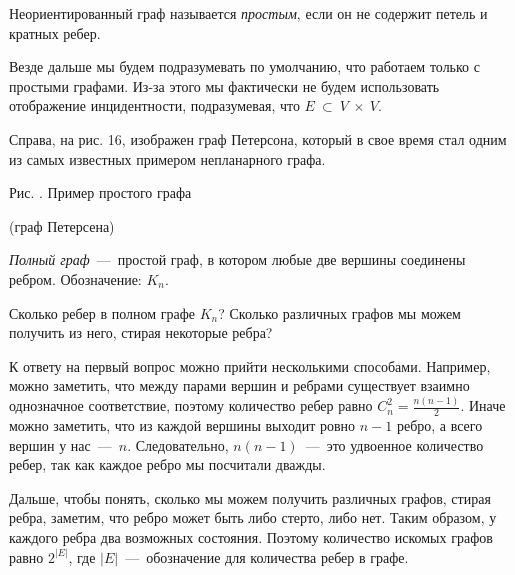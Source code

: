 \begin{paracol}{2}
\begin{definition}
	Неориентированный граф называется \emph{простым}, если он не содержит петель и кратных ребер.
\end{definition}

	Везде дальше мы будем подразумевать по умолчанию, что работаем только с простыми графами. Из-за этого мы фактически не будем использовать отображение инцидентности, подразумевая, что $E~\subset~V~\times~V$.
	
	Справа, на рис. 16, изображен граф Петерсона, который в свое время стал одним из самых известных примером непланарного графа.
\switchcolumn
\begin{center}\end{center}
\begin{center}
	\small Рис. \images. Пример простого графа 
	
	(граф Петерсена)
\end{center}
\end{paracol}

\begin{definition}
	\emph{Полный граф}~---~простой граф, в котором любые две вершины соединены ребром. Обозначение: $K_n$.
\end{definition}

\begin{example}
	Сколько ребер в полном графе $K_n$? Сколько различных графов мы можем получить из него, стирая некоторые ребра?
	
	К ответу на первый вопрос можно прийти несколькими способами. Например, можно заметить, что между парами вершин и ребрами существует взаимно однозначное соответствие, поэтому количество ребер равно $C_n^2 = \frac{n(n-1)}{2}$. Иначе можно заметить, что из каждой вершины выходит ровно $n - 1$ ребро, а всего вершин у нас~---~$n$. Следовательно, $n(n-1)$~---~это удвоенное количество ребер, так как каждое ребро мы посчитали дважды.
	
	Дальше, чтобы понять, сколько мы можем получить различных графов, стирая ребра, заметим, что ребро может быть либо стерто, либо нет. Таким образом, у каждого ребра два возможных состояния. Поэтому количество искомых графов равно $2^{|E|}$, где $|E|$~---~обозначение для количества ребер в графе. 
\end{example}


